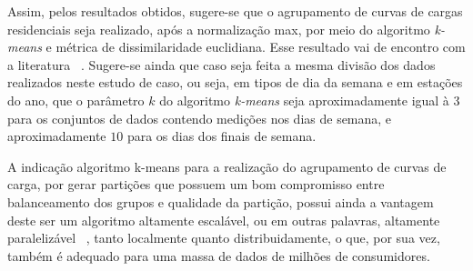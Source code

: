 Assim, pelos resultados obtidos, sugere-se que o agrupamento de curvas de cargas residenciais seja realizado, após a normalização max, por meio do algoritmo \emph{k-means} e métrica de dissimilaridade euclidiana. Esse resultado vai de encontro com a literatura ~\parencite{Chicco}. Sugere-se ainda que caso seja feita a mesma divisão dos dados realizados neste estudo de caso, ou seja, em tipos de dia da semana e em estações do ano, que o parâmetro $k$ do algoritmo \emph{k-means} seja aproximadamente igual à 3 para os conjuntos de dados contendo medições nos dias de semana, e aproximadamente $10$ para os dias dos finais de semana. 

A indicação algoritmo k-means para a realização do agrupamento de curvas de carga, por gerar partições que possuem um bom compromisso entre balanceamento dos grupos e qualidade da partição, possui ainda a vantagem deste ser um algoritmo altamente escalável, ou em outras palavras,  altamente paralelizável ~\parencite{zhao2009parallel, stoffel1999parallel, bahmani2012scalable}, tanto localmente quanto distribuidamente, o que, por sua vez, também é adequado para uma massa de dados de milhões de consumidores.
